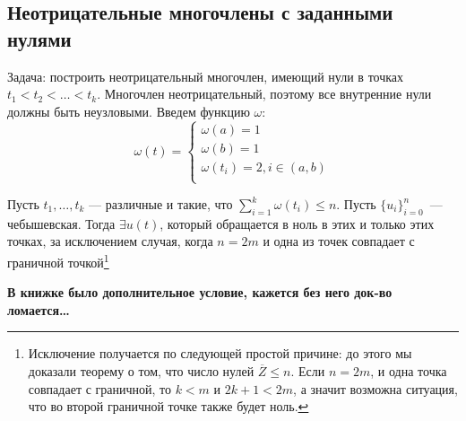 \subsection{Неотрицательные многочлены с заданными нулями}
Задача: построить неотрицательный многочлен, имеющий нули в точках $t_1 < t_2 < … < t_k$. Многочлен неотрицательный, поэтому все внутренние нули должны быть неузловыми. Введем функцию $\omega$:
$$ \omega(t) = \begin{cases}
    \omega(a) = 1\\
    \omega(b) = 1\\
    \omega(t_i) = 2, i \in (a,b) \\
\end{cases}
$$
\begin{thm}
Пусть $t_1, …, t_k$ — различные и такие, что $\sum \limits_{i=1}^{k} \omega(t_i) \leq n$. Пусть $\{u_i\}_{i=0}^{n}$ — чебышевская. Тогда $\exists u(t)$, который обращается в ноль в этих и только этих точках, за исключением случая, когда $n=2m$ и одна из точек совпадает с граничной точкой\footnote{Исключение получается по следующей простой причине: до этого мы доказали теорему о том, что число нулей $\overline{Z} \leq n$. Если $n=2m$, и одна точка совпадает с граничной, то $k < m$ и $2k+1 < 2m$, а значит возможна ситуация, что во второй граничной точке также будет ноль.}
\end{thm}

\textbf{В книжке было дополнительное условие, кажется без него док-во ломается…}

